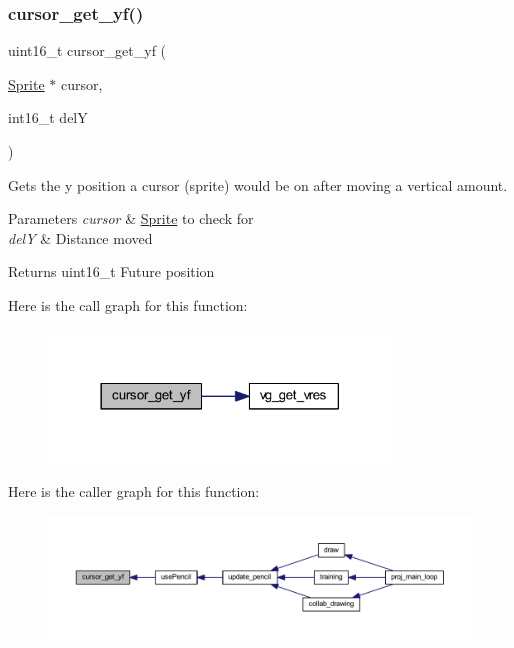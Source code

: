 \subsubsection{\texorpdfstring{cursor\+\_\+get\+\_\+yf()}{cursor\_get\_yf()}}
{\footnotesize\ttfamily uint16\+\_\+t cursor\+\_\+get\+\_\+yf (\begin{DoxyParamCaption}\item[{\mbox{\hyperlink{struct_sprite}{Sprite}} $\ast$}]{cursor,  }\item[{int16\+\_\+t}]{delY }\end{DoxyParamCaption})}



Gets the y position a cursor (sprite) would be on after moving a vertical amount. 


\begin{DoxyParams}{Parameters}
{\em cursor} & \mbox{\hyperlink{struct_sprite}{Sprite}} to check for \\
\hline
{\em delY} & Distance moved \\
\hline
\end{DoxyParams}
\begin{DoxyReturn}{Returns}
uint16\+\_\+t Future position 
\end{DoxyReturn}
Here is the call graph for this function\+:\nopagebreak
\begin{figure}[H]
\begin{center}
\leavevmode
\includegraphics[width=258pt]{group__sprite_gabfdb11ab1c80b5083fd8b64320139924_cgraph}
\end{center}
\end{figure}
Here is the caller graph for this function\+:\nopagebreak
\begin{figure}[H]
\begin{center}
\leavevmode
\includegraphics[width=350pt]{group__sprite_gabfdb11ab1c80b5083fd8b64320139924_icgraph}
\end{center}
\end{figure}
\mbox{\label{group__sprite_ga6b75c612ee123b9b3261a831fd6d805b}} 
